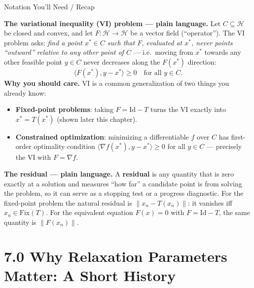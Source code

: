 \documentclass[aspectratio=169,10pt]{beamer}
\newcommand{\mHH}{\mathcal H}
\newcommand{\inner}[2]{\langle #1, #2 \rangle}
\newcommand{\norm}[1]{\left\|#1\right\|}
\newcommand{\Fix}{\mathrm{Fix}}
\newcommand{\Id}{\mathrm{Id}}
\begin{document}
\begin{frame}[allowframebreaks]{Notation You'll Need / Recap}
  \framebreak

  \textbf{The variational inequality (VI) problem --- plain
  language.} Let $C\subseteq\mHH$ be closed and convex, and let
  $F:\mHH\to\mHH$ be a vector field (``operator''). The VI problem
  asks: \emph{find a point $x^*\in C$ such that $F$, evaluated at
  $x^*$, never points ``outward'' relative to any other point of
  $C$} --- i.e.\ moving from $x^*$ towards any other feasible point
  $y\in C$ never decreases along the $F(x^*)$ direction:
  \[
    \inner{F(x^*)}{y-x^*}\ge0 \quad\text{for all } y\in C.
  \]
  \textbf{Why you should care.} VI is a common generalization of two
  things you already know:
  \begin{itemize}
    \item \textbf{Fixed-point problems}: taking $F=\Id-T$ turns the
          VI exactly into $x^*=T(x^*)$ (shown later this chapter).
    \item \textbf{Constrained optimization}: minimizing a
          differentiable $f$ over $C$ has first-order optimality
          condition $\inner{\nabla f(x^*)}{y-x^*}\ge0$ for all
          $y\in C$ --- precisely the VI with $F=\nabla f$.
  \end{itemize}

  \textbf{The residual --- plain language.} A \textbf{residual} is
  any quantity that is zero exactly at a solution and measures
  ``how far'' a candidate point is from solving the problem, so it
  can serve as a stopping test or a progress diagnostic. For the
  fixed-point problem the natural residual is
  $\norm{x_n-T(x_n)}$: it vanishes iff $x_n\in\Fix(T)$. For the
  equivalent equation $F(x)=0$ with $F=\Id-T$, the same quantity is
  $\norm{F(x_n)}$.

\end{frame}

\section{7.0 Why Relaxation Parameters Matter: A Short History}
\end{document}
